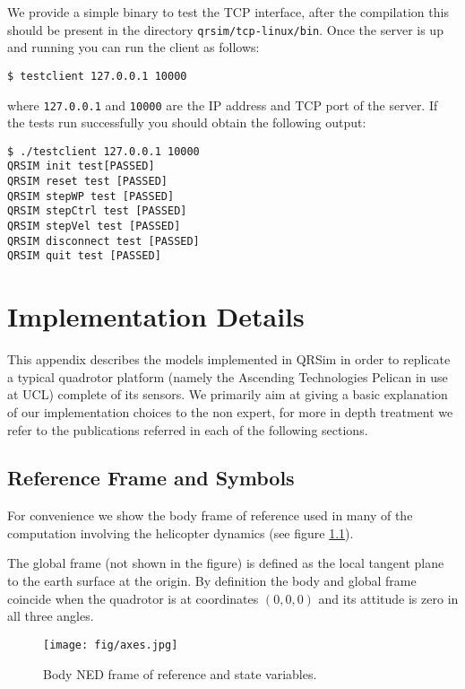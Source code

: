 \documentclass[a4paper,11pt]{report}
\newcommand{\sname}{QRSim\xspace}
\begin{document}
We provide a simple binary to test the TCP interface, after the compilation this should be present in the directory \texttt{qrsim/tcp-linux/bin}.
Once the server is up and running you can run the client as follows:
\begin{verbatim}
$ testclient 127.0.0.1 10000
\end{verbatim}
where \texttt{127.0.0.1} and \texttt{10000} are the IP address and TCP port of the server.
If the tests run successfully you should obtain the following output:
\begin{verbatim}
$ ./testclient 127.0.0.1 10000
QRSIM init test[PASSED]
QRSIM reset test [PASSED]
QRSIM stepWP test [PASSED]
QRSIM stepCtrl test [PASSED]
QRSIM stepVel test [PASSED]
QRSIM disconnect test [PASSED]
QRSIM quit test [PASSED]
\end{verbatim}



\appendix
\chapter{Implementation Details}

This appendix describes the models implemented in \sname in order to replicate a typical quadrotor platform (namely the Ascending Technologies Pelican \cite{asctec2011pelican} in use at UCL) complete of its sensors.
We primarily aim at giving a basic explanation of our implementation choices to the non expert, for more in depth treatment we refer to the publications referred in each of the following sections.

\section{Reference Frame and Symbols}

For convenience we show the body frame of reference used in many of the computation involving the helicopter dynamics (see figure \ref{fig:axes}).
 
The global frame (not shown in the figure) is defined as the local tangent plane to the earth surface at the origin. 
By definition the body and global frame coincide when the quadrotor is at coordinates $(0,0,0)$ and its attitude is zero in all three angles.
\begin{figure}[htbp]
 \begin{center}
 \texttt{[image: fig/axes.jpg]}
\caption{Body NED frame of reference and state variables.\label{fig:axes}}
\end{center}
\end{figure} 
\end{document}
